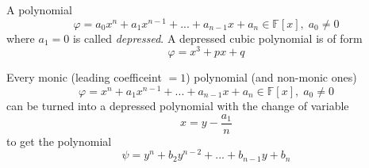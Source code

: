 \documentclass{article}
\begin{document}
      \begin{definition}
        A polynomial 
        \begin{equation}
          \varphi = a_0 x^n + a_1 x^{n-1} + ... + a_{n-1} x + a_n \in \mathbb{F}[x], \; a_0 \neq 0
        \end{equation}
        where $a_1 = 0$ is called \textit{depressed}. A depressed cubic polynomial is of form
        \begin{equation}
          \varphi = x^3 + p x + q
        \end{equation}
      \end{definition}

      \begin{proposition}
        Every monic (leading coefficeint $=1$) polynomial (and non-monic ones) 
        \begin{equation}
          \varphi = x^n + a_1 x^{n-1} + ... + a_{n-1} x + a_n \in \mathbb{F}[x], \; a_0 \neq 0
        \end{equation}
        can be turned into a depressed polynomial with the change of variable
        \begin{equation}
          x = y - \frac{a_1}{n}
        \end{equation}
        to get the polynomial 
        \begin{equation}
          \psi = y^n + b_2 y^{n-2} + ... + b_{n-1} y + b_n
        \end{equation}
      \end{proposition}
\end{document}
